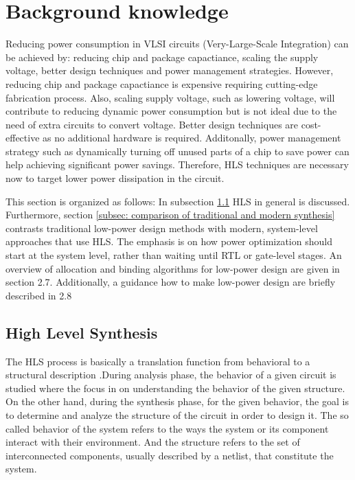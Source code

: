 \documentclass[conference]{IEEEtran}
\begin{document}
\section{Background knowledge}
\label{sec: fundamentals}
Reducing power consumption in VLSI circuits (Very-Large-Scale Integration) can be achieved by: reducing chip and package capactiance, scaling the supply voltage, better design techniques and power management strategies. However, reducing chip and package capactiance is expensive requiring cutting-edge fabrication process. Also, scaling supply voltage, such as lowering voltage, will contribute to reducing dynamic power consumption but is not ideal due to the need of extra circuits to convert voltage. Better design techniques are cost-effective as no additional hardware is required. Additonally, power management strategy such as dynamically turning off unused parts of a chip to save power can help achieving significant power savings. Therefore, HLS techniques are necessary now to target lower power dissipation in the circuit.

This section is organized as follows: In subsection \ref{subsec: HLS} HLS in general is discussed. Furthermore, section \ref{subsec: comparison of traditional and modern synthesis} contrasts traditional low-power design methods with modern, system-level approaches that use HLS. The emphasis is on how power optimization should start at the system level, rather than waiting until RTL or gate-level stages. An overview of allocation and binding algorithms for low-power design are given in section 2.7. Additionally, a guidance how to make low-power design are briefly described in 2.8


\subsection{High Level Synthesis}
\label{subsec: HLS}
The HLS process is basically a translation function from behavioral to a structural description \cite{DDG92}.During analysis phase, the behavior of a given circuit is studied where the focus in on understanding the behavior of the given structure. On the other hand, during the synthesis phase, for the given behavior, the goal is to determine and analyze the structure of the circuit in order to design it. The so called behavior of the system refers to the ways the system or its component interact with their environment. And the structure refers to the set of interconnected components, usually described by a netlist, that constitute the system. 
\end{document}

